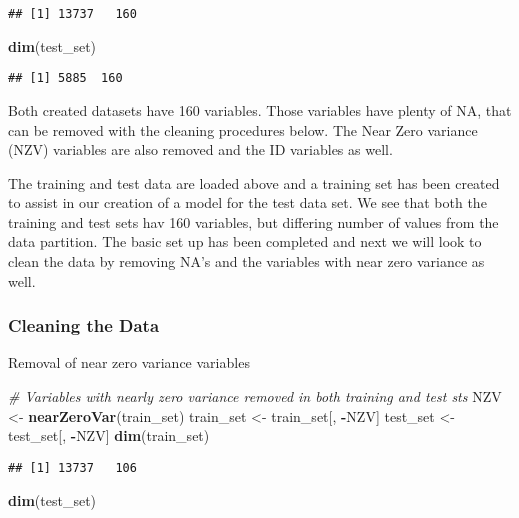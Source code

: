 \documentclass[]{article}
\newenvironment{Shaded}{\begin{snugshade}}{\end{snugshade}}
\newcommand{\KeywordTok}[1]{\textcolor[rgb]{0.13,0.29,0.53}{\textbf{#1}}}
\newcommand{\StringTok}[1]{\textcolor[rgb]{0.31,0.60,0.02}{#1}}
\newcommand{\CommentTok}[1]{\textcolor[rgb]{0.56,0.35,0.01}{\textit{#1}}}
\newcommand{\OperatorTok}[1]{\textcolor[rgb]{0.81,0.36,0.00}{\textbf{#1}}}
\newcommand{\NormalTok}[1]{#1}
\begin{document}
\begin{verbatim}
## [1] 13737   160
\end{verbatim}

\begin{Shaded}
\begin{Highlighting}[]
\KeywordTok{dim}\NormalTok{(test_set)}
\end{Highlighting}
\end{Shaded}

\begin{verbatim}
## [1] 5885  160
\end{verbatim}

Both created datasets have 160 variables. Those variables have plenty of
NA, that can be removed with the cleaning procedures below. The Near
Zero variance (NZV) variables are also removed and the ID variables as
well.

The training and test data are loaded above and a training set has been
created to assist in our creation of a model for the test data set. We
see that both the training and test sets hav 160 variables, but
differing number of values from the data partition. The basic set up has
been completed and next we will look to clean the data by removing NA's
and the variables with near zero variance as well.

\subsubsection{Cleaning the Data}\label{cleaning-the-data}

Removal of near zero variance variables

\begin{Shaded}
\begin{Highlighting}[]
\CommentTok{# Variables with nearly zero variance removed in both training and test sts}
\NormalTok{NZV <-}\StringTok{ }\KeywordTok{nearZeroVar}\NormalTok{(train_set)}
\NormalTok{train_set <-}\StringTok{ }\NormalTok{train_set[, }\OperatorTok{-}\NormalTok{NZV]}
\NormalTok{test_set  <-}\StringTok{ }\NormalTok{test_set[, }\OperatorTok{-}\NormalTok{NZV]}
\KeywordTok{dim}\NormalTok{(train_set)}
\end{Highlighting}
\end{Shaded}

\begin{verbatim}
## [1] 13737   106
\end{verbatim}

\begin{Shaded}
\begin{Highlighting}[]
\KeywordTok{dim}\NormalTok{(test_set)}
\end{Highlighting}
\end{Shaded}
\end{document}
